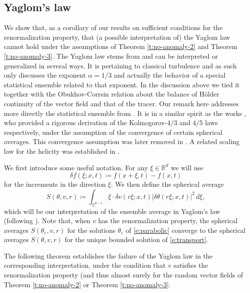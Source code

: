\documentclass[11pt,reqno]{amsart}
\theoremstyle{definition}
\numberwithin{equation}{section}
\begin{document}
\subsection{Yaglom's law}\label{s:Yaglom-2}
We show that, as a corollary of our results on sufficient conditions for the renormalization property, that (a possible interpretation of) the Yaglom law cannot hold under the assumptions of Theorem \ref{t:no-anomaly-2} and Theorem \ref{t:no-anomaly-3}. The Yaglom law stems from \cite{Yaglom1949} and can be interpreted or generalized in several ways. It is pertaining to classical turbulence and as such only discusses the exponent $\alpha=1/3$ and actually the behavior of a special statistical ensemble related to that exponent. In the discussion above we tied it together with the Obukhov-Corrsin relation about the balance of H\"older continuity of the vector field and that of the tracer. Our remark here addresses more directly the statistical ensemble from \cite{Yaglom1949}. It  is in a similar spirit as the works \cite{DuchonRobert2000,Eyink2003}, who provided a rigorous derivation of the Kolmogorov-$4/3$ and $4/5$ laws respectively, under the assumption of the convergence of certain spherical averages. This convergence assumption was later removed in \cite{Novack2024}. A related scaling law for the helicity was established in \cite{BoutrosTiti2025}. 

We first introduce some useful notation. For any $\xi \in \mathbb{R}^d$ we will use
\begin{equation*}
\delta f (\xi ; x, t) \coloneqq f(x + \xi, t) - f(x,t)
\end{equation*}
for the increments in the direction $\xi$.
We then define the spherical average
\begin{equation}
S(\theta,v, r) \coloneqq \int_{\mathbb{S}^{d-1}} \xi \cdot \delta v (r \xi; x,t) \lvert \delta \theta (r \xi; x,t) \rvert^2 \, d \xi,
\end{equation}
which will be our interpretation of the ensemble average in Yaglom's law (following \cite{DuchonRobert2000,Eyink2003}). Note that, when $v$ has the renormalization property, the spherical averages $S (\theta_\varepsilon, v,r)$ for the solutions $\theta_\varepsilon$ of \eqref{e:parabolic} converge to the spherical averages $S(\theta,v,r)$ for the unique bounded solution of \eqref{e:transport}.

The following theorem establishes the failure of the Yaglom law in the corresponding interpretation, under the condition that $v$ satisfies the renormalization property (and thus almost surely for the random vector fields of Theorem \ref{t:no-anomaly-2} or Theorem \ref{t:no-anomaly-3}.
\end{document}
